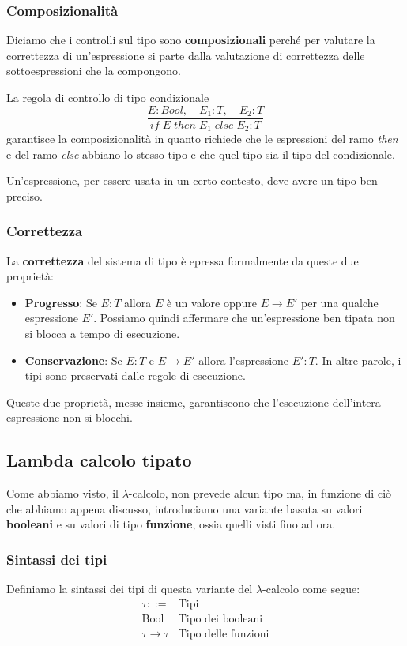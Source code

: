 \subsubsection{Composizionalità}
Diciamo che i controlli sul tipo sono \textbf{composizionali} perché per valutare la correttezza di un'espressione si parte
dalla valutazione di correttezza delle sottoespressioni che la compongono.

La regola di controllo di tipo condizionale
\[ \frac{E : Bool, \quad E_1 : T, \quad E_2 : T}{if \; E \; then \; E_1 \; else \; E_2 : T} \]
garantisce la composizionalità in quanto richiede che le espressioni del ramo \emph{then} e del ramo \emph{else} abbiano
lo stesso tipo e che quel tipo sia il tipo del condizionale.

Un'espressione, per essere usata in un certo contesto, deve avere un tipo ben preciso.

\subsubsection{Correttezza}
La \textbf{correttezza} del sistema di tipo è epressa formalmente da queste due proprietà:
\begin{itemize}
	\item \textbf{Progresso}: Se $E : T$ allora $E$ è un valore oppure $E \rightarrow E'$ per una qualche espressione $E'$.
	      Possiamo quindi affermare che un'espressione ben tipata non si blocca a tempo di esecuzione.
	\item \textbf{Conservazione}: Se $E : T$ e $E \rightarrow E'$ allora l'espressione $E' : T$. In altre parole, i tipi
	      sono preservati dalle regole di esecuzione.
\end{itemize}
Queste due proprietà, messe insieme, garantiscono che l'esecuzione dell'intera espressione non si blocchi.

\subsection{Lambda calcolo tipato}
Come abbiamo visto, il $\lambda$-calcolo, non prevede alcun tipo ma, in funzione di ciò che abbiamo appena discusso,
introduciamo una variante basata su valori \textbf{booleani} e su valori di tipo \textbf{funzione}, ossia quelli visti fino
ad ora.

\subsubsection{Sintassi dei tipi}
Definiamo la sintassi dei tipi di questa variante del $\lambda$-calcolo come segue:
\[
	\begin{array}{lr}
		\tau ::=              & \text{Tipi}                \\
		\text{Bool}           & \text{Tipo dei booleani}   \\
		\tau \rightarrow \tau & \text{Tipo delle funzioni}
	\end{array}
\]

